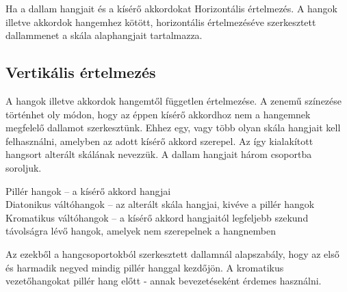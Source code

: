 Ha a dallam hangjait és a kísérő akkordokat Horizontális értelmezés.
A hangok illetve akkordok hangemhez kötött, horizontális értelmezéséve szerkesztett dallammenet a skála alaphangjait tartalmazza.
\subsection{Vertikális értelmezés}
A hangok illetve akkordok hangemtől független értelmezése. A zenemű színezése történhet oly módon, hogy az éppen kísérő akkordhoz nem a hangemnek megfelelő dallamot szerkesztünk. Ehhez egy, vagy több olyan skála hangjait kell felhasználni, amelyben az adott kísérő akkord szerepel. Az így kialakított hangsort alterált skálának nevezzük.
A dallam hangjait három csoportba soroljuk.
\begin{pitemize}
Pillér hangok -- a kísérő akkord hangjai \\
Diatonikus váltóhangok -- az alterált skála hangjai, kivéve a pillér hangok \\
Kromatikus váltóhangok -- a kísérő akkord hangjaitól legfeljebb szekund távolságra lévő hangok, amelyek nem szerepelnek a hangnemben \\
\end{pitemize}
Az ezekből a hangcsoportokból szerkesztett dallamnál alapszabály, hogy az első és harmadik negyed mindig pillér hanggal kezdőjön. A kromatikus vezetőhangokat pillér hang előtt - annak bevezetéseként érdemes használni.

